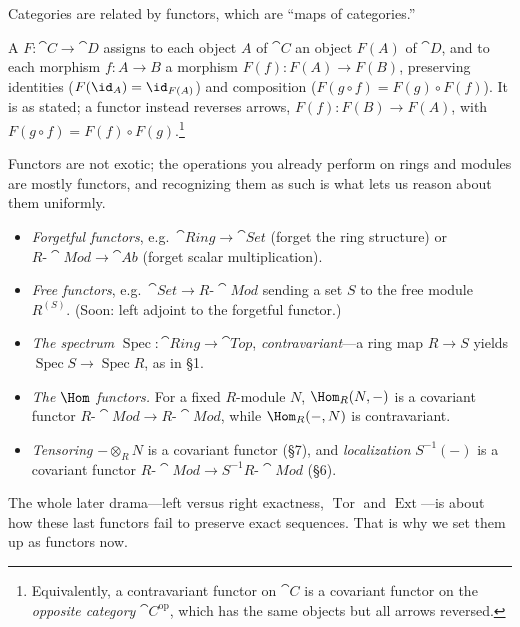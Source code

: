 \documentclass[11pt]{article}
\DeclareMathOperator{\Spec}{Spec}
\DeclareMathOperator{\Tor}{Tor}
\DeclareMathOperator{\Ext}{Ext}
\begin{document}
Categories are related by functors, which are ``maps of categories.''

\begin{ddefinition}[Functor]
A  $F\colon\cat{C}\to\cat{D}$ assigns to each object $A$ of $\cat{C}$ an
object $F(A)$ of $\cat{D}$, and to each morphism $f\colon A\to B$ a morphism
$F(f)\colon F(A)\to F(B)$, preserving identities ($F(\id_A)=\id_{F(A)}$) and composition
($F(g\circ f)=F(g)\circ F(f)$). It is  as stated; a 
functor instead reverses arrows, $F(f)\colon F(B)\to F(A)$, with $F(g\circ f)=F(f)\circ
F(g)$.\footnote{Equivalently, a contravariant functor on $\cat{C}$ is a covariant functor on
the \emph{opposite category} $\cat{C}^{\mathrm{op}}$, which has the same objects but all
arrows reversed.}
\end{ddefinition}

Functors are not exotic; the operations you already perform on rings and modules are mostly
functors, and recognizing them as such is what lets us reason about them uniformly.

\begin{eexample}
\begin{itemize}\setlength{\itemsep}{2pt}
\item \emph{Forgetful functors}, e.g.\ $\cat{Ring}\to\cat{Set}$ (forget the ring structure)
or $R\text{-}\cat{Mod}\to\cat{Ab}$ (forget scalar multiplication).
\item \emph{Free functors}, e.g.\ $\cat{Set}\to R\text{-}\cat{Mod}$ sending a set $S$ to the
free module $R^{(S)}$. (Soon: left adjoint to the forgetful functor.)
\item \emph{The spectrum} $\Spec\colon\cat{Ring}\to\cat{Top}$, \emph{contravariant}---a ring
map $R\to S$ yields $\Spec S\to\Spec R$, as in \S1.
\item \emph{The $\Hom$ functors.} For a fixed $R$-module $N$, $\Hom_R(N,-)$ is a covariant
functor $R\text{-}\cat{Mod}\to R\text{-}\cat{Mod}$, while $\Hom_R(-,N)$ is contravariant.
\item \emph{Tensoring} $-\otimes_R N$ is a covariant functor (\S7), and \emph{localization}
$S^{-1}(-)$ is a covariant functor $R\text{-}\cat{Mod}\to S^{-1}R\text{-}\cat{Mod}$ (\S6).
\end{itemize}
The whole later drama---left versus right exactness, $\Tor$ and $\Ext$---is about how these
last functors fail to preserve exact sequences. That is why we set them up as functors now.
\end{eexample}
\end{document}
